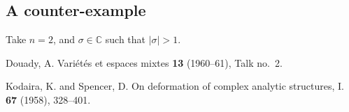 \documentclass{article}
\theoremstyle{plain}
\theoremstyle{definition}
\newcommand{\CC}{\mathbb{C}}
\begin{document}
\subsection{A counter-example}
\label{III.4}

Take $n=2$, and $\sigma\in\CC$ such that $|\sigma|>1$.






\nocite{*}

\begin{thebibliography}{2}

  {\sc Douady, A.}
  \newblock Vari\'{e}t\'{e}s et espaces mixtes
   \textbf{13} (1960--61), Talk no.~2.

  {\sc Kodaira, K. and Spencer, D.}
  \newblock On deformation of complex analytic structures, I.
   \textbf{67} (1958), 328--401.

\end{thebibliography}
\end{document}
